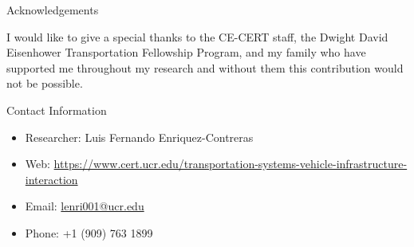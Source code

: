 \documentclass[final, 20 pt]{beamer}
\newlength{\onecolwid}
\begin{document}
\begin{frame}[t]
\begin{columns}[t]
\begin{column}{\onecolwid}

\begin{block}{Acknowledgements}

I would like to give a special thanks to the CE-CERT staff, the Dwight David Eisenhower Transportation Fellowship Program, and my family who have supported me throughout my research and without them this contribution would not be possible. \\

\end{block}




\begin{alertblock}{Contact Information}
	
	\begin{itemize}
		\item Researcher: Luis Fernando Enriquez-Contreras
		\item Web: \href{https://www.cert.ucr.edu/transportation-systems-vehicle-infrastructure-interaction}{https://www.cert.ucr.edu/transportation-systems-vehicle-infrastructure-interaction}
		\item Email: \href{lenri001@ucr.edu}{lenri001@ucr.edu}
		\item Phone: +1 (909) 763 1899
	\end{itemize}
	
\end{alertblock}

\begin{center}
	\begin{tabular}{ccc}
	\end{tabular}
\end{center}

\end{column} %

\end{columns} %

\end{frame} %
\end{document}
